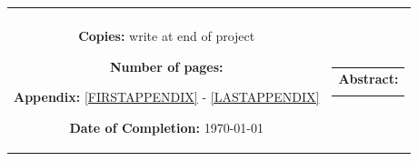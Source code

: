 \begin{titlepage}
\begin{nopagebreak}
{\begin{tabular}{cc}
{\begin{description}
						\item {\bf Supervisor:}\\
							\supervisor
						\newline

						\item {\bf Copies:} write at end of project %
						\newline
						\item {\bf Number of pages:} \numpages
						\newline
						\item {\bf Appendix:} \ref{FIRSTAPPENDIX} - \ref{LASTAPPENDIX}
						\newline
						\item {\bf Date of Completion:} \today
					\end{description}
					\vfill
				} &
				\parbox{8cm}{
					\vspace{.15cm}
					\hfill 
					\begin{tabular}{l}
						{\bf Abstract:}\bigskip \\
						\fbox{
							\parbox{6.5cm}{\smallskip
								{\vfill{\small 
								\smallskip}}
							}
						}
  					\end{tabular}
  				}
			\end{tabular}
		}
	\end{nopagebreak}
\end{titlepage}